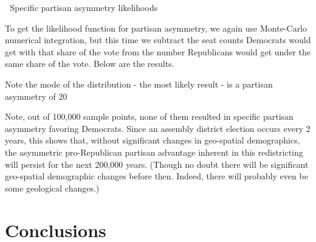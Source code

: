 \documentclass[preprint,12pt]{article}
\begin{document}
 

Specific partisan asymmetry likelihoods
 
To get the likelihood function for partisan asymmetry, we again use Monte-Carlo numerical integration, but this time we subtract the seat counts Democrats would get with that share of the vote from the number Republicans would get under the same share of the vote.  Below are the results.
 

 
Note the mode of the distribution - the most likely result - is a partisan asymmetry of 20%
 
Note, out of 100,000 sample points, none of them resulted in specific partisan asymmetry favoring Democrats.  Since an assembly district election occurs every 2 years, this shows that, without significant changes in geo-spatial demographics, the asymmetric pro-Republican partisan advantage inherent in this redistricting will persist for the next 200,000 years.  (Though no doubt there will be significant geo-spatial demographic changes before then.  Indeed, there will probably even be some geological changes.)



\section{Conclusions}
\end{document}
